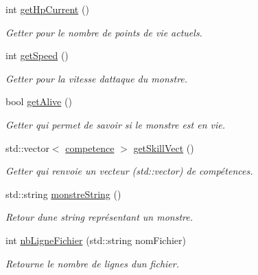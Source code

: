 \begin{DoxyCompactItemize}
\mbox{\label{classmonstre_a5cda5112e283bc62d0a8a2d8c21885e2}} 
int \hyperlink{classmonstre_a5cda5112e283bc62d0a8a2d8c21885e2}{get\+Hp\+Current} ()
\begin{DoxyCompactList}\small\item\em Getter pour le nombre de points de vie actuels. \end{DoxyCompactList}\item 
\mbox{\label{classmonstre_a0177c6bac35608e9c940de2550f0b3be}} 
int \hyperlink{classmonstre_a0177c6bac35608e9c940de2550f0b3be}{get\+Speed} ()
\begin{DoxyCompactList}\small\item\em Getter pour la vitesse d\textquotesingle{}attaque du monstre. \end{DoxyCompactList}\item 
\mbox{\label{classmonstre_a7b92c8b92f0e30c4e90b6e797124a841}} 
bool \hyperlink{classmonstre_a7b92c8b92f0e30c4e90b6e797124a841}{get\+Alive} ()
\begin{DoxyCompactList}\small\item\em Getter qui permet de savoir si le monstre est en vie. \end{DoxyCompactList}\item 
\mbox{\label{classmonstre_a9529ed40be5fc8a806a7ae0287995ff1}} 
std\+::vector$<$ \hyperlink{classcompetence}{competence} $>$ \hyperlink{classmonstre_a9529ed40be5fc8a806a7ae0287995ff1}{get\+Skill\+Vect} ()
\begin{DoxyCompactList}\small\item\em Getter qui renvoie un vecteur (std\+::vector) de compétences. \end{DoxyCompactList}\item 
std\+::string \hyperlink{classmonstre_a70fd98734f8ce2ae1e856c7d9194e89d}{monstre\+String} ()
\begin{DoxyCompactList}\small\item\em Retour d\textquotesingle{}une string représentant un monstre. \end{DoxyCompactList}\item 
int \hyperlink{classmonstre_a7591cd207cd1bee68ca79ce489f41ce2}{nb\+Ligne\+Fichier} (std\+::string nom\+Fichier)
\begin{DoxyCompactList}\small\item\em Retourne le nombre de lignes d\textquotesingle{}un fichier. \end{DoxyCompactList}\item 

\end{DoxyCompactItemize}
